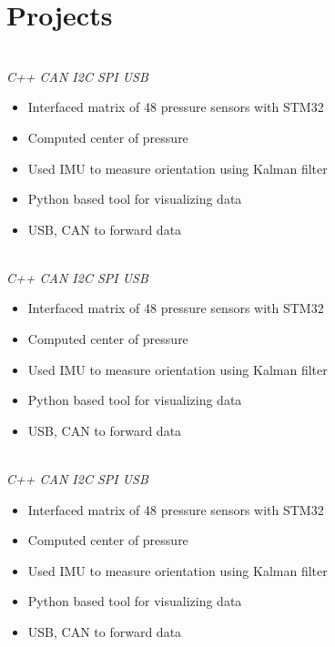 \section{Projects}


\\
\fontsize{11pt}{11pt}\textit{C++ \textbullet CAN \textbullet I2C \textbullet SPI \textbullet USB}
        \begin{itemize}
            \item Interfaced matrix of 48 pressure sensors with STM32
            \item Computed center of pressure
            \item Used IMU to measure orientation using Kalman filter
            \item Python based tool for visualizing data
            \item USB, CAN to forward data
        \end{itemize}

\vspace*{10pt}
\\
\fontsize{11pt}{11pt}\textit{C++ \textbullet CAN \textbullet I2C \textbullet SPI \textbullet USB}
        \begin{itemize}
            \item Interfaced matrix of 48 pressure sensors with STM32
            \item Computed center of pressure
            \item Used IMU to measure orientation using Kalman filter
            \item Python based tool for visualizing data
            \item USB, CAN to forward data
        \end{itemize}

\vspace*{10pt}

\\
\fontsize{11pt}{11pt}\textit{C++ \textbullet CAN \textbullet I2C \textbullet SPI \textbullet USB}
        \begin{itemize}
            \item Interfaced matrix of 48 pressure sensors with STM32
            \item Computed center of pressure
            \item Used IMU to measure orientation using Kalman filter
            \item Python based tool for visualizing data
            \item USB, CAN to forward data
        \end{itemize}


